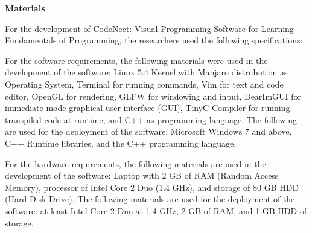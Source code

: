 \flushleft
\textbf{Materials}\\
\justifying

\parx
For the development of CodeNect: Visual Programming Software for Learning
Fundamentals of Programming, the researchers used the following specifications:

\parx
For the software requirements, the following materials were used in the
development of the software: Linux 5.4 Kernel with Manjaro distrubution as
Operating System, Terminal for running commands, Vim for text and code editor,
OpenGL for rendering, GLFW for windowing and input, DearImGUI for immediate
mode graphical user interface (GUI), TinyC Compiler for running transpiled code
at runtime, and C++ as programming language. The following are used for the
deployment of the software: Microsoft Windows 7 and above, C++ Runtime
libraries, and the C++ programming language.

\parx
For the hardware requirements, the following materials are used in the
development of the software: Laptop with 2 GB of RAM (Random Access Memory),
processor of Intel Core 2 Duo (1.4 GHz), and storage of 80 GB HDD (Hard Disk
Drive). The following materials are used for the deployment of the software: at
least Intel Core 2 Duo at 1.4 GHz, 2 GB of RAM, and 1 GB HDD of storage.
